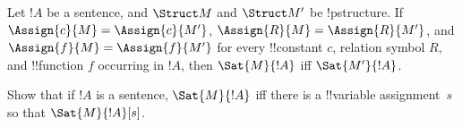 \documentclass[../../include/open-logic-section]{subfiles}
\begin{document}

\begin{cor}[Extensionality]
Let $!A$ be a sentence, and $\Struct M$ and $\Struct M'$ be !p{structure}. 
If $\Assign{c}{M} = \Assign{c}{M'}$, $\Assign{R}{M}=\Assign{R}{M'}$, and 
$\Assign{f}{M} = \Assign{f}{M'}$ for every !!{constant} $c$, relation 
symbol $R$, and !!{function} $f$ occurring in $!A$, then $\Sat{M}{!A}$ 
iff $\Sat{M'}{!A}$.
\end{cor}

\begin{prob}
Show that if $!A$ is a sentence, $\Sat{M}{!A}$ iff there is a !!{variable}
assignment~$s$ so that $\Sat{M}{!A}[s]$.
\end{prob}
\end{document}
